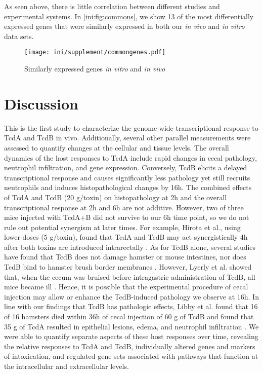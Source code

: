 As seen above, there is little correlation between different studies
and experimental systems. In \autoref{ini:fig:commons}, we show
13 of the most differentially expressed genes that were similarly 
expressed in both our \emph{in vivo} and \emph{in vitro} data sets.

\begin{figure}
\centering
\texttt{[image: ini/supplement/commongenes.pdf]}
\caption{Similarly expressed genes \emph{in vitro} and \emph{in vivo}}
\label{ini:fig:commons}
\end{figure}


\section{Discussion}

This is the first study to characterize the genome-wide transcriptional 
response to TcdA and TcdB in vivo. Additionally, several other parallel 
measurements were assessed to quantify changes at the cellular and 
tissue levels. The overall dynamics of the host responses to TcdA 
include rapid changes in cecal pathology, neutrophil infiltration, 
and gene expression. Conversely, TcdB elicits a delayed 
transcriptional response and causes significantly less pathology 
yet still recruits neutrophils and induces histopathological 
changes by 16h. The combined effects of TcdA and TcdB 
(20 \textmugreek{}g/toxin) on histopathology at 2h and the overall 
transcriptional response at 2h and 6h are not additive. 
However, two of three mice injected with TcdA+B did not 
survive to our 6h time point, so we do not rule out potential 
synergism at later times. For example, Hirota et al., using 
lower doses (5 \textmugreek{}g/toxin), found that TcdA and TcdB may act 
synergistically 4h after both toxins are introduced intrarectally 
\cite{Hirota:2012gx}. As for TcdB alone, several studies have 
found that TcdB does not damage hamster or mouse intestines, nor 
does TcdB bind to hamster brush border membranes 
\cite{Lyerly:1985dx,Rolfe:1991vx}. However, Lyerly et al. 
showed that, when the cecum was bruised before intragastric 
administration of TcdB, all mice became ill \cite{Lyerly:1985dx}. 
Hence, it is possible that the experimental procedure of cecal 
injection may allow or enhance the TcdB-induced pathology we 
observe at 16h. In line with our findings that TcdB has pathologic 
effects, Libby et al. found that 16 of 16 hamsters died within 36h 
of cecal injection of 60 \textmugreek{}g of TcdB and found that 35 \textmugreek{}g of TcdA 
resulted in epithelial lesions, edema, and neutrophil 
infiltration \cite{Libby:1982wm}. We were able to quantify separate 
aspects of these host responses over time, revealing the 
relative responses to TcdA and TcdB, individually altered 
genes and markers of intoxication, and regulated gene sets 
associated with pathways that function at the intracellular 
and extracellular levels.

